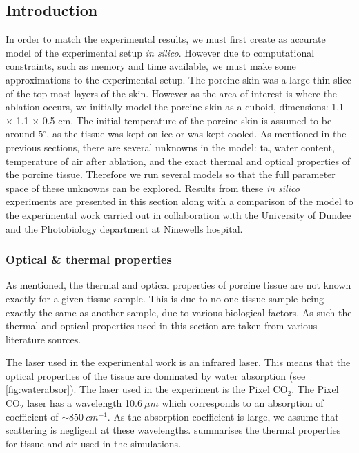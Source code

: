 \subsection{Introduction}

In order to match the experimental results, we must first create as accurate model of the experimental setup \textit{in silico}. However due to computational constraints, such as memory and time available, we must make some approximations to the experimental setup. The porcine skin was a large thin slice of the top most layers of the skin. However as the area of interest is where the ablation occurs, we initially  model the porcine skin as a cuboid, dimensions:  1.1 $\times$ 1.1 $\times$ 0.5 cm. The initial temperature of the porcine skin is assumed to be around 5$^{\circ}$, as the tissue was kept on ice or was kept cooled. 
As mentioned in the previous sections, there are several unknowns in the model: \gls{ta}, water content, temperature of air after ablation, and the exact thermal and optical properties of the porcine tissue. Therefore we run several models so that the full parameter space of these unknowns can be explored.
Results from these \textit{in silico} experiments are presented in this section along with a comparison of the model to the experimental work carried out in collaboration with the University of Dundee and the Photobiology department at Ninewells hospital.


\subsubsection{Optical \& thermal properties}

As mentioned, the thermal and optical properties of porcine tissue are not known exactly for a given tissue sample. This is due to no one tissue sample being exactly the same as another sample, due to various biological factors. As such the thermal and optical properties used in this section are taken from various literature sources.

The laser used in the experimental work is an infrared laser. This means that the optical properties of the tissue are dominated by water absorption (see \cref{fig:waterabsor}). The laser used in the experiment is the Pixel CO$_2$\cite{pixelco2}. The Pixel CO$_2$ laser has a wavelength 10.6$~\mu m$ which corresponds to an absorption of coefficient of $\sim 850~cm^{-1}$. As the absorption coefficient is large, we assume that scattering is negligent at these wavelengths.
 summarises the thermal properties for tissue and air used in the simulations.  

